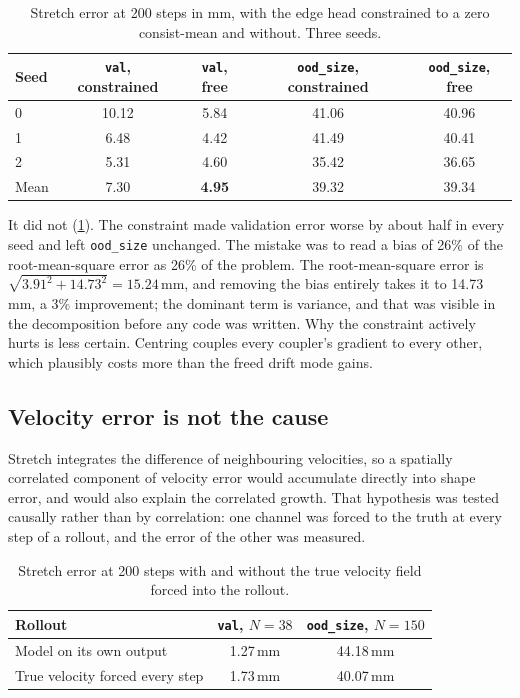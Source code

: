 \begin{table}[htbp]
    \centering
    \begin{tabular}{lcccc}
        \toprule
        Seed & \texttt{val}, constrained & \texttt{val}, free & \texttt{ood\_size}, constrained & \texttt{ood\_size}, free \\
        \midrule
        0 & 10.12 & 5.84 & 41.06 & 40.96 \\
        1 & 6.48  & 4.42 & 41.49 & 40.41 \\
        2 & 5.31  & 4.60 & 35.42 & 36.65 \\
        \midrule
        Mean & 7.30 & \textbf{4.95} & 39.32 & 39.34 \\
        \bottomrule
    \end{tabular}
    \caption{Stretch error at 200 steps in mm, with the edge head constrained to a zero consist-mean and without. Three seeds.}
    \label{tab:train_zero_mean}
\end{table}

It did not (\cref{tab:train_zero_mean}). The constraint made validation error worse by about half in every seed and left \texttt{ood\_size} unchanged. The mistake was to read a bias of 26\% of the root-mean-square error as 26\% of the problem. The root-mean-square error is $\sqrt{3.91^{2} + 14.73^{2}} = 15.24$\,mm, and removing the bias entirely takes it to 14.73\,mm, a 3\% improvement; the dominant term is variance, and that was visible in the decomposition before any code was written. Why the constraint actively hurts is less certain. Centring couples every coupler's gradient to every other, which plausibly costs more than the freed drift mode gains.

\subsection{Velocity error is not the cause}

Stretch integrates the difference of neighbouring velocities, so a spatially correlated component of velocity error would accumulate directly into shape error, and would also explain the correlated growth. That hypothesis was tested causally rather than by correlation: one channel was forced to the truth at every step of a rollout, and the error of the other was measured.

\begin{table}[htbp]
    \centering
    \begin{tabular}{lcc}
        \toprule
        Rollout & \texttt{val}, $N = 38$ & \texttt{ood\_size}, $N = 150$ \\
        \midrule
        Model on its own output         & 1.27\,mm & 44.18\,mm \\
        True velocity forced every step & 1.73\,mm & 40.07\,mm \\
        \bottomrule
    \end{tabular}
    \caption{Stretch error at 200 steps with and without the true velocity field forced into the rollout.}
    \label{tab:train_shape_oracle}
\end{table}

